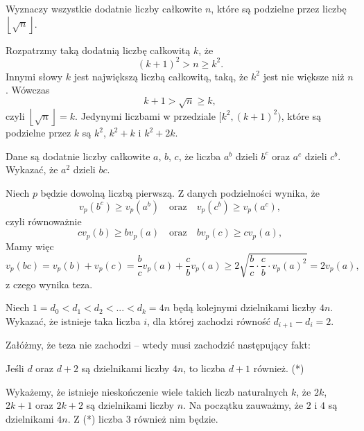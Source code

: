 \newpage
{}

\begin{problem}{1}
	Wyznaczy wszystkie dodatnie liczby całkowite $n$, które są podzielne przez liczbę~$\left\lfloor \sqrt{n} \right\rfloor$.
\end{problem}


\noindent
Rozpatrzmy taką dodatnią liczbę całkowitą $k$, że
\[
	(k + 1)^2 > n \geqslant k^2.
\]
Innymi słowy $k$ jest największą liczbą całkowitą, taką, że $k^2$ jest nie większe niż $n$. Wówczas
\[
	k + 1 > \sqrt{n} \geqslant k,
\]
czyli $\left\lfloor \sqrt{n} \right\rfloor = k$. Jedynymi liczbami w przedziale $[k^2, (k + 1)^2)$, które są podzielne przez $k$ są $k^2$, $k^2 + k$ i $k^2 + 2k$.


\begin{problem}{2}
	Dane są dodatnie liczby całkowite $a$, $b$, $c$, że liczba $a^b$ dzieli $b^c$ oraz $a^c$ dzieli $c^b$. Wykazać, że $a^2$ dzieli $bc$.
\end{problem}

\noindent
Niech $p$ będzie dowolną liczbą pierwszą.
Z danych podzielności wynika, że
\[
	v_p(b^c) \geqslant v_p(a^b) \quad \text{oraz} \quad v_p(c^b) \geqslant v_p(a^c),
\]
czyli równoważnie
\[
	cv_p(b) \geqslant bv_p(a) \quad \text{oraz} \quad bv_p(c) \geqslant cv_p(a),
\]
Mamy więc
\[
	v_p(bc) = v_p(b) + v_p(c) = \frac{b}{c}v_p(a) +  \frac{c}{b}v_p(a) \geqslant 2\sqrt{\frac{b}{c} \cdot \frac{c}{b} \cdot v_p(a)^2} = 2v_p(a),
\]
z czego wynika teza.


\begin{problem}{3}
	Niech $1 = d_0 < d_1 < d_2 < ... < d_k = 4n$ będą kolejnymi dzielnikami liczby $4n$. Wykazać, że istnieje taka liczba $i$, dla której zachodzi równość $d_{i + 1} - d_i = 2$.
\end{problem}

\noindent
Załóżmy, że teza nie zachodzi -- wtedy musi zachodzić następujący fakt:
\begin{center} 
	Jeśli $d$ oraz $d + 2$ są dzielnikami liczby $4n$, to liczba $d + 1$ również. (*)
\end{center}
Wykażemy, że istnieje nieskończenie wiele takich liczb naturalnych $k$, że $2k$, $2k + 1$ oraz $2k + 2$ są dzielnikami liczby $n$. Na początku zauważmy, że $2$ i $4$ są dzielnikami $4n$. Z (*) liczba $3$ również nim będzie. 


